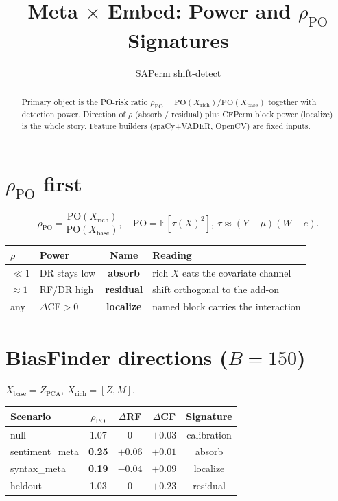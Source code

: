 \documentclass[11pt]{article}
\title{Meta $\times$ Embed: Power and $\rho_{\mathrm{PO}}$ Signatures}
\author{SAPerm shift-detect}
\date{}
\begin{document}
\maketitle

\begin{abstract}
\noindent
Primary object is the PO-risk ratio
$\rho_{\mathrm{PO}}=\mathrm{PO}(X_{\mathrm{rich}})/\mathrm{PO}(X_{\mathrm{base}})$
together with detection power. Direction of $\rho$ (absorb / residual) plus
CFPerm block power (localize) is the whole story. Feature builders
(spaCy+VADER, OpenCV) are fixed inputs.
\end{abstract}

\section{$\rho_{\mathrm{PO}}$ first}
\[
\rho_{\mathrm{PO}}=\frac{\mathrm{PO}(X_{\mathrm{rich}})}{\mathrm{PO}(X_{\mathrm{base}})},
\quad
\mathrm{PO}=\mathbb{E}[\tau(X)^2],\
\tau\approx(Y-\mu)(W-e).
\]
\begin{center}
\begin{tabular}{llcl}
\toprule
$\rho$ & Power & Name & Reading \\
\midrule
$\ll 1$ & DR stays low & \textbf{absorb} & rich $X$ eats the covariate channel \\
$\approx 1$ & RF/DR high & \textbf{residual} & shift orthogonal to the add-on \\
any & $\Delta$CF${>}0$ & \textbf{localize} & named block carries the interaction \\
\bottomrule
\end{tabular}
\end{center}

\section{BiasFinder directions ($B{=}150$)}
$X_{\mathrm{base}}=Z_{\mathrm{PCA}}$, $X_{\mathrm{rich}}=[Z,M]$.
\begin{center}
\begin{tabular}{lcccc}
\toprule
Scenario & $\rho_{\mathrm{PO}}$ & $\Delta$RF & $\Delta$CF & Signature \\
\midrule
null & 1.07 & $0$ & $+0.03$ & calibration \\
sentiment\_meta & \textbf{0.25} & $+0.06$ & $+0.01$ & absorb \\
syntax\_meta & \textbf{0.19} & $-0.04$ & $\mathbf{+0.09}$ & localize \\
heldout & 1.03 & $0$ & $\mathbf{+0.23}$ & residual \\
\bottomrule
\end{tabular}
\end{center}
\end{document}
